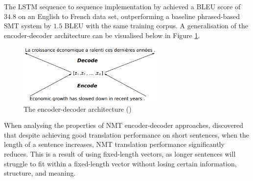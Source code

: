 The \acrshort{LSTM} sequence to sequence implementation by \cite{sutskever_sequence_2014} achieved a \acrshort{BLEU} score of $34.8$ on an English to French data set, outperforming a baseline phrased-based \acrshort{SMT} system by $1.5$ \acrshort{BLEU} with the same training corpus.
A generalisation of the encoder-decoder architecture can be visualised below in Figure \ref{fig:encoder_decoder}.
\begin{figure}[ht!]
\centering
\includegraphics[width=0.64\textwidth]{media/literature/machine_translation/mt_encoder-decoder.png}
\caption[Diagram of the encoder-decoder architecture]{The encoder-decoder architecture (\cite{cho_properties_2014})}
\label{fig:encoder_decoder}
\end{figure}







When analysing the properties of \acrshort{NMT} encoder-decoder approaches, \cite{cho_properties_2014} discovered that despite achieving good translation performance on short sentences, when the length of a sentence increases, \acrshort{NMT} translation performance significantly reduces. This is a result of using fixed-length vectors, as longer sentences will struggle to fit within a fixed-length vector without losing certain information, structure, and meaning.

